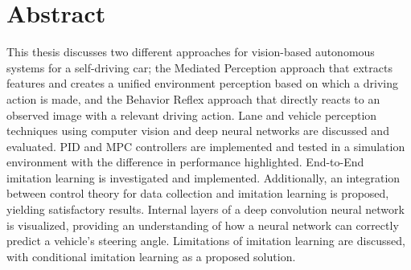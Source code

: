 \chapter*{Abstract}
\label{chap:abstract}
\pagestyle{plain}

This thesis discusses two different approaches for vision-based autonomous systems for a self-driving car; the Mediated Perception approach that extracts features and creates a unified environment perception based on which a driving action is made, and the Behavior Reflex approach that directly reacts to an observed image with a relevant driving action. Lane and vehicle perception techniques using computer vision and deep neural networks are discussed and evaluated. PID and MPC controllers are implemented and tested in a simulation environment with the difference in performance highlighted. End-to-End imitation learning is investigated and implemented. Additionally, an integration between control theory for data collection and imitation learning is proposed, yielding satisfactory results. Internal layers of a deep convolution neural network is visualized, providing an understanding of how a neural network can correctly predict a vehicle's steering angle. Limitations of imitation learning are discussed, with conditional imitation learning as a proposed solution.